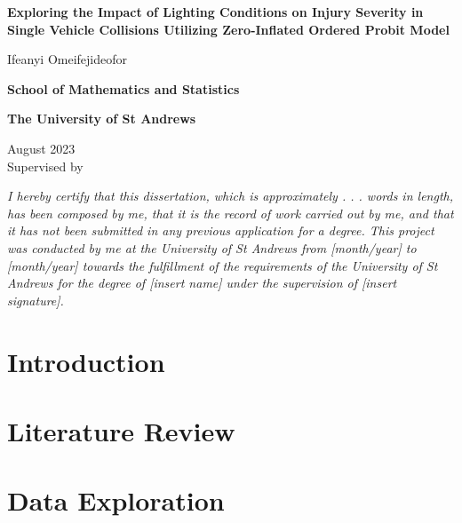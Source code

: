 \documentclass[12]{report}
\begin{document}
\begin{titlepage}
    \centering
    \vspace*{1cm}
    \begin{spacing}{2}
    \textbf{\Huge Exploring the Impact of Lighting Conditions on Injury Severity in Single Vehicle Collisions Utilizing  Zero-Inflated Ordered Probit Model}
    \end{spacing}
    
    \vspace{1cm}
    
    {\Large 
    Ifeanyi Omeifejideofor \\
    \vspace{0.5cm}
    
    \textbf{School of Mathematics and Statistics} \\
     \vspace{0.5cm}
     
    \textbf{The University of St Andrews} \\
     \vspace{0.5cm}
     
    August 2023 \\
     \vspace{0.5cm}
    Supervised by }
    
    \vfill

    {\large 
    \textit{
    I hereby certify that this dissertation, which is approximately . . . words in length, has been composed by me, that it is the record of work carried out by me, and that it has not been submitted in any previous application for a degree. This project was conducted by me at the University of St Andrews from [month/year] to [month/year] towards the fulfillment of the requirements of the University of St Andrews for the degree of [insert name] under the supervision of [insert signature].
    }}

    \vfill

\end{titlepage}



\chapter{Introduction}

\chapter{Literature Review}

\chapter{Data Exploration}
\end{document}
